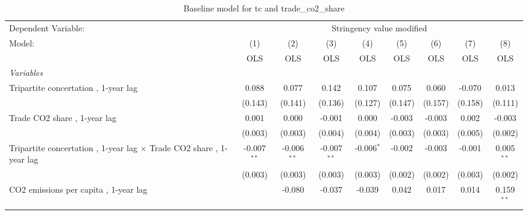 
\begin{table}[htbp]
   \caption{Baseline model for tc and trade\_co2\_share}
   \centering
   \begin{tabular}{lcccccccc}
      \toprule
      Dependent Variable: & \multicolumn{8}{c}{Stringency value modified}\\
      Model:                                                                      & (1)           & (2)           & (3)           & (4)          & (5)         & (6)          & (7)          & (8)\\  
                                                                                  &  OLS          & OLS           & OLS           & OLS          & OLS         & OLS          & OLS          & OLS\\  
      \midrule
      \emph{Variables}\\
      Tripartite concertation , 1-year lag                                        & 0.088         & 0.077         & 0.142         & 0.107        & 0.075       & 0.060        & -0.070       & 0.013\\   
                                                                                  & (0.143)       & (0.141)       & (0.136)       & (0.127)      & (0.147)     & (0.157)      & (0.158)      & (0.111)\\   
      Trade CO2 share , 1-year lag                                                & 0.001         & 0.000         & -0.001        & 0.000        & -0.003      & -0.003       & 0.002        & -0.003\\   
                                                                                  & (0.003)       & (0.003)       & (0.004)       & (0.004)      & (0.003)     & (0.003)      & (0.005)      & (0.002)\\   
      Tripartite concertation , 1-year lag $\times$ Trade CO2 share , 1-year lag  & -0.007$^{**}$ & -0.006$^{**}$ & -0.007$^{**}$ & -0.006$^{*}$ & -0.002      & -0.003       & -0.001       & 0.005$^{**}$\\   
                                                                                  & (0.003)       & (0.003)       & (0.003)       & (0.003)      & (0.002)     & (0.002)      & (0.003)      & (0.002)\\   
      CO2 emissions per capita , 1-year lag                                       &               & -0.080        & -0.037        & -0.039       & 0.042       & 0.017        & 0.014        & 0.159$^{**}$\\   

\end{tabular}
\end{table}
